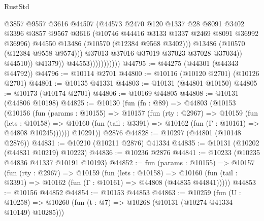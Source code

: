 \begin{lexlean}{RustStd}
\begin{coremodule}
                                        @3857
                                        @9557
                                        @3616
                                        @44507
                                        (@44573
                                          @2470
                                          @120
                                          @1337
                                          @28
                                          @8091
                                          @3402
                                          @3396
                                          @3857
                                          @9567
                                          @3616
                                          (@10746 @44416 @3133 @1337 @2469 @8091 @36992 @36996)
                                          @44550
                                          @13486
                                          (@10570 (@12384 @9568 @3402)))
                                        @13486
                                        (@10570 (@12384 @9558 @9574)))
                                      @37013
                                      @37016
                                      @37019
                                      @37023
                                      @37028
                                      @37034))
                                  @44510))
                              @41379))
                          @44553)))))))))))
@44795 := @44275 (@44301 (@44343 @44792))
@44796 := @10114 @2701
@44800 := @10116 (@10120 @2701) (@10126 @2701)
@44801 := @10135 @41331
@44803 := @10131 (@44801 @10150)
@44805 := @10173 (@10174 @2701)
@44806 := @10169 @44805
@44808 := @10131 (@44806 @10198)
@44825 := @10130
    (fun (fn : @89) =>
    @44803
      (@10153
        (@10156
          (fun (params : @10155) =>
          @10157
            (fun (rty : @2967) =>
            @10159
              (fun (lets : @10158) =>
              @10160 (fun (tail : @3391) => @10162 (fun (Γ : @10161) => @44808 @10245))))))
        @10291))
    @2876
@44828 := @10297 (@44801 (@10148 @2876))
@44831 := @10210 (@10211 @2876) @41334
@44835 := @10131 (@10202 (@44831 @10219) @10223)
@44836 := @10236 @2876
@44841 := @10233 (@10235 @44836 @41337 @10191 @10193)
@44852 := fun (params : @10155) =>
  @10157
    (fun (rty : @2967) =>
    @10159
      (fun (lets : @10158) =>
      @10160 (fun (tail : @3391) => @10162 (fun (Γ : @10161) => @44808 (@44835 @44841)))))
@44853 := @10156 @44852
@44854 := @10153 @44853
@44863 := @10259
    (fun (U : @10258) => @10260 (fun (t : @7) => @10268 (@10131 (@10274 @41334 @10149) @10285)))

\end{coremodule}
\end{lexlean}
